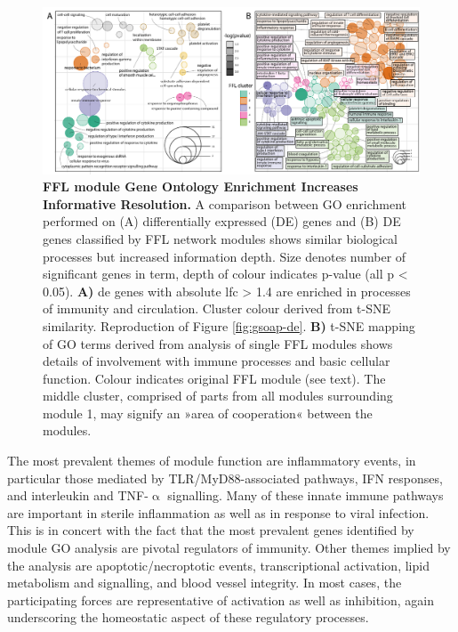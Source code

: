 \begin{figure}
\includegraphics[width=\textwidth]{figures/gsoap-ffl}
\caption[FFL module Gene Ontology Enrichment.]{\textbf{FFL module Gene Ontology Enrichment Increases Informative Resolution.} A comparison between GO enrichment performed on (A) differentially expressed (DE) genes and (B) DE genes classified by FFL network modules shows similar biological processes but increased information depth. Size denotes number of significant genes in term, depth of colour indicates p-value (all p < 0.05). \textbf{A)} \Acl{de} genes with absolute \acl{lfc} > 1.4 are enriched in processes of immunity and circulation. Cluster colour derived from t-SNE similarity. Reproduction of Figure \ref{fig:gsoap-de}. \textbf{B)} t-SNE mapping of GO terms derived from analysis of single FFL modules shows details of involvement with immune processes and basic cellular function. Colour indicates original FFL module (see text). The middle cluster, comprised of parts from all modules surrounding module 1, may signify an »area of cooperation« between the modules.
\label{fig:gsoap-ffl}}
\end{figure}

The most prevalent themes of module function are inflammatory events, in particular those mediated by TLR/MyD88-associated pathways, IFN responses, and interleukin and TNF-$\upalpha$ signalling. Many of these innate immune pathways are important in sterile inflammation as well as in response to viral infection. This is in concert with the fact that the most prevalent genes identified by module GO analysis are pivotal regulators of immunity. Other themes implied by the analysis are apoptotic/necroptotic events, transcriptional activation, lipid metabolism and signalling, and blood vessel integrity. In most cases, the participating forces are representative of activation as well as inhibition, again underscoring the homeostatic aspect of these regulatory processes.

